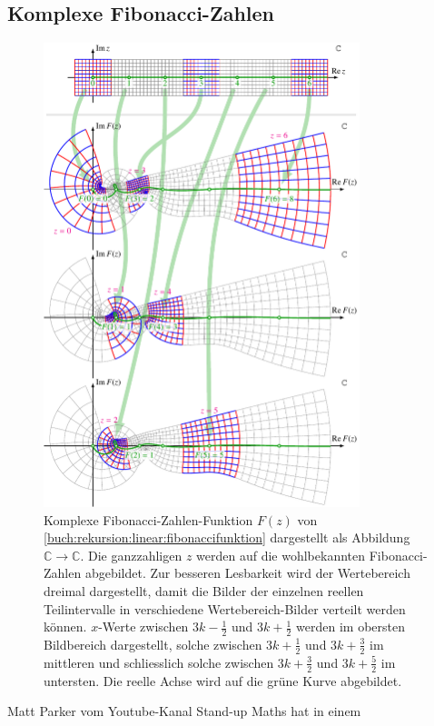 \subsection{Komplexe Fibonacci-Zahlen}
\begin{figure}
\centering
\includegraphics[width=0.82\textwidth]{chapters/040-rekursion/images/fibonacci.pdf}
\caption{Komplexe Fibonacci-Zahlen-Funktion $F(z)$ von
\eqref{buch:rekursion:linear:fibonaccifunktion}
dargestellt als Abbildung $\mathbb{C}\to\mathbb{C}$.
Die ganzzahligen $z$ werden auf die wohlbekannten Fibonacci-Zahlen
abgebildet.
Zur besseren Lesbarkeit wird der Wertebereich dreimal dargestellt,
damit die Bilder der einzelnen reellen Teilintervalle in verschiedene
Wertebereich-Bilder verteilt werden können.
$x$-Werte zwischen $3k-\frac12$ und $3k+\frac12$ werden im obersten
Bildbereich dargestellt, solche zwischen $3k+\frac12$ und $3k+\frac32$ 
im mittleren und schliesslich solche zwischen $3k+\frac32$ und $3k+\frac52$
im untersten.
Die reelle Achse wird auf die grüne Kurve abgebildet.
\label{buch:rekursion:linear:fibonaccigraph}}
\end{figure}
Matt Parker vom Youtube-Kanal Stand-up Maths hat in einem
